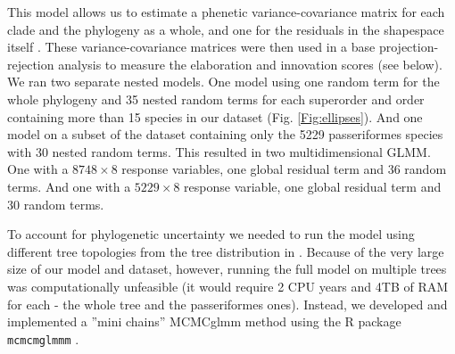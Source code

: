 \documentclass[12pt,letterpaper]{article}
\begin{document}
This model allows us to estimate a phenetic variance-covariance matrix for each clade and the phylogeny as a whole, and one for the residuals in the shapespace itself \cite{robinson2013quantifying}.
These variance-covariance matrices were then used in a base projection-rejection analysis to measure the elaboration and innovation scores (see below).
We ran two separate nested models.
One model using one random term for the whole phylogeny and 35 nested random terms for each superorder and order containing more than 15 species in our dataset (Fig. \ref{Fig:ellipses}).
And one model on a subset of the dataset containing only the 5229 passeriformes species with 30 nested random terms.
This resulted in two multidimensional GLMM.
One with a $8748 \times 8$ response variables, one global residual term and 36 random terms.
And one with a $5229 \times 8$ response variable, one global residual term and 30 random terms.
 
To account for phylogenetic uncertainty we needed to run the model using different tree topologies from the tree distribution in \cite{jetz2012global}.
Because of the very large size of our model and dataset, however, running the full model on multiple trees was computationally unfeasible (it would require 2 CPU years and 4TB of RAM for each - the whole tree and the passeriformes ones).
Instead, we developed and implemented a ''mini chains'' MCMCglmm method using the R package \texttt{mcmcmglmmm} \cite{mcmcmcglmmm}.
\end{document}
